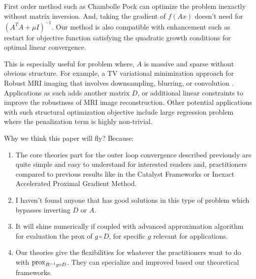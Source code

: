 \documentclass[12pt]{article}
\begin{document}
    First order method such as Chambolle Pock can optimize the problem inexactly without matrix inversion. 
    And, taking the gradient of $f(Ax)$ doesn't need for $(A^TA + \mu I)^{-1}$. 
    Our method is also compatible with enhancement such as restart for objective function satisfying the quadratic growth conditions for optimal linear convergence. 
    \par
    This is especially useful for problem where, $A$ is massive and sparse without obvious structure. 
    For example, a TV variational minimization approach for Robust MRI imaging that involves downsampling, blurring, or convolution \cite{zhang_robust_2022, joshi_mri_2009}\cite[Section 7.4]{chambolle_introduction_2016}. 
    Applications as such adds another matrix $D$, or additional linear constraints to improve the robustness of MRI image reconstruction. 
    Other potential applications with such structural optimization objective include large regression problem where the penalization term is highly non-trivial. 
    \par
    Why we think this paper will fly? 
    Because: 
    \begin{enumerate}
        \item The core theories part for the outer loop convergence described previously are quite simple and easy to understand for interested readers and, practitioners compared to previous results like in the Catalyst Frameworks or Inexact Accelerated Proximal Gradient Method. 
        \item I haven't found anyone that has good solutions in this type of problem which bypasses inverting $D$ or $A$. 
        \item It will shine numerically if coupled with advanced approximation algorithm for evaluation the prox of $g\circ D$, for specific $g$ relevant for applications. 
        \item Our theories give the flexibilities for whatever the practitioners want to do with $\operatorname{prox}_{B^{-1}g\circ D}$. They can specialize and improved based our theoretical frameworks. 
    \end{enumerate}
    



\end{document}
